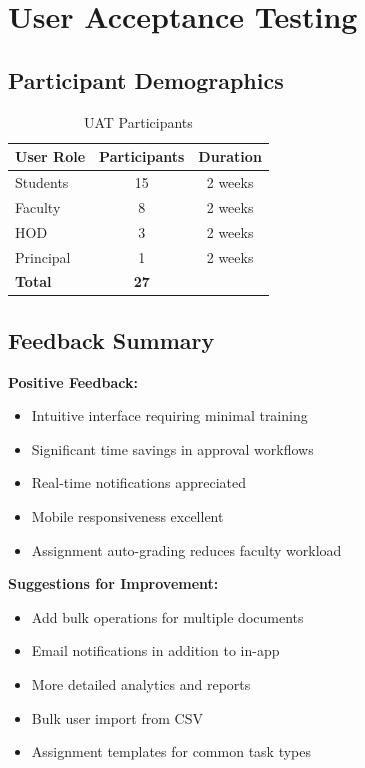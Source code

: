 \section{User Acceptance Testing}

\subsection{Participant Demographics}

\begin{table}[H]
\centering
\begin{tabular}{|l|c|c|}
\hline
\textbf{User Role} & \textbf{Participants} & \textbf{Duration} \\
\hline
Students & 15 & 2 weeks \\
Faculty & 8 & 2 weeks \\
HOD & 3 & 2 weeks \\
Principal & 1 & 2 weeks \\
\hline
\textbf{Total} & \textbf{27} & \textbf{} \\
\hline
\end{tabular}
\caption{UAT Participants}
\end{table}

\subsection{Feedback Summary}

\textbf{Positive Feedback:}
\begin{itemize}
\item Intuitive interface requiring minimal training
\item Significant time savings in approval workflows
\item Real-time notifications appreciated
\item Mobile responsiveness excellent
\item Assignment auto-grading reduces faculty workload
\end{itemize}

\textbf{Suggestions for Improvement:}
\begin{itemize}
\item Add bulk operations for multiple documents
\item Email notifications in addition to in-app
\item More detailed analytics and reports
\item Bulk user import from CSV
\item Assignment templates for common task types
\end{itemize}

